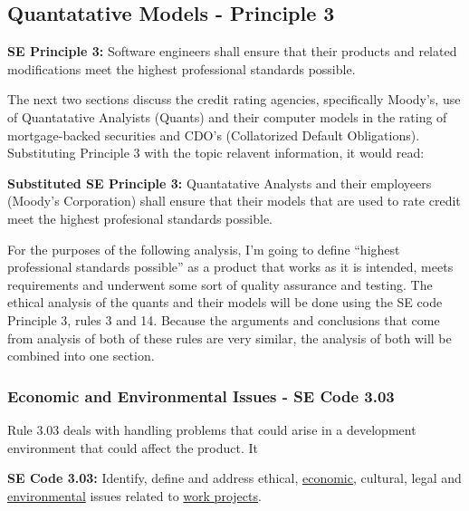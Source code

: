 \documentclass[11pt]{article}
\begin{document}
\begin{multicols}{2}
 
\subsection{Quantatative Models - Principle 3}

\begin{framed}
\noindent
\textbf{SE Principle 3:  }
\newline
Software engineers shall ensure that their products and related modifications meet the highest professional standards possible.
\end{framed}


The next two sections discuss the credit rating agencies, specifically Moody's, use of Quantatative Analyists (Quants) and their computer models in the rating of mortgage-backed securities and CDO's (Collatorized Default Obligations).  Substituting Principle 3 with the topic relavent information, it would read:

\begin{framed}
\noindent
{\bf Substituted SE Principle 3:}
\newline
Quantatative Analysts and their employeers (Moody's Corporation) shall ensure that their models that are used to rate credit meet the highest profesional standards possible.
\end{framed}

For the purposes of the following analysis, I'm going to define ``highest professional standards possible'' as a product that works as it is intended, meets requirements and underwent some sort of quality assurance and testing.  The ethical analysis of the quants and their models will be done using the SE code Principle 3, rules 3 and 14.  Because the arguments and conclusions that come from analysis of both of these rules are very similar, the analysis of both will be combined into one section.


\subsubsection{Economic and Environmental Issues - SE Code 3.03}


Rule 3.03 deals with handling problems that could arise in a development environment that could affect the product.  It

\begin{framed}
\noindent
   \textbf{SE Code 3.03: }  
   \newline
   Identify, define and address ethical, \underline{economic}, cultural, legal and \underline{environmental} issues related to \underline{work projects}.
\end{framed}
   

\end{multicols}
\end{document}
